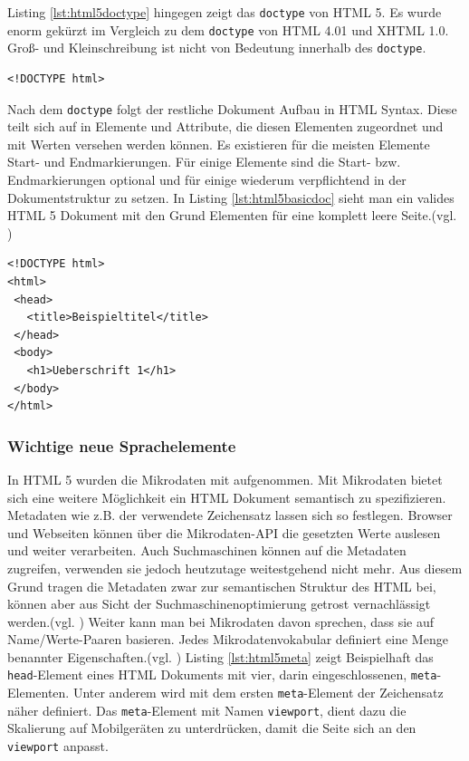 Listing \ref{lst:html5doctype}	hingegen zeigt das \texttt{doctype} von HTML 5. Es wurde enorm gekürzt im Vergleich zu dem \texttt{doctype} von HTML 4.01 und XHTML 1.0. Groß- und Kleinschreibung ist nicht von Bedeutung innerhalb des \texttt{doctype}. 

\vspace{1em}
\begin{lstlisting}[language=HTML5, caption=HTML 5 \texttt{doctype}-Element, label=lst:html5doctype]
<!DOCTYPE html>
\end{lstlisting}		
	
Nach dem \texttt{doctype} folgt der restliche Dokument Aufbau in HTML Syntax. Diese teilt sich auf in Elemente und Attribute, die diesen Elementen zugeordnet und mit Werten versehen werden können. Es existieren für die meisten Elemente Start- und Endmarkierungen. Für einige Elemente sind die Start- bzw. Endmarkierungen optional und für einige wiederum verpflichtend in der Dokumentstruktur zu setzen. In Listing \ref{lst:html5basicdoc} sieht man ein valides HTML 5 Dokument mit den Grund Elementen für eine komplett leere Seite.(vgl. \cite[S.58]{KronHTML2011})

\vspace{1em}
\begin{lstlisting}[language=HTML5, caption=HTML 5 Basis Dokument, label=lst:html5basicdoc]
<!DOCTYPE html>
<html>
 <head>
   <title>Beispieltitel</title>
 </head>
 <body>
   <h1>Ueberschrift 1</h1>
 </body>
</html>
\end{lstlisting}
	
\subsubsection{Wichtige neue Sprachelemente} In HTML 5 wurden die Mikrodaten mit aufgenommen. Mit Mikrodaten bietet sich eine weitere Möglichkeit ein HTML Dokument semantisch zu spezifizieren. Metadaten wie z.B. der verwendete Zeichensatz lassen sich so festlegen. Browser und Webseiten können über die Mikrodaten-API die gesetzten Werte auslesen und weiter verarbeiten. Auch Suchmaschinen können auf die Metadaten zugreifen, verwenden sie jedoch heutzutage weitestgehend nicht mehr. Aus diesem Grund tragen die Metadaten zwar zur semantischen Struktur des HTML bei, können aber aus Sicht der Suchmaschinenoptimierung getrost vernachlässigt werden.(vgl. \cite{SelfHtml20142}) Weiter kann man bei Mikrodaten davon sprechen, \glqq [...] dass sie auf Name/Werte-Paaren basieren. Jedes Mikrodatenvokabular definiert eine Menge benannter Eigenschaften.\grqq{}(vgl. \cite[S.174]{PilgDurc2011}) Listing \ref{lst:html5meta} zeigt Beispielhaft das \texttt{head}-Element eines HTML Dokuments mit vier, darin eingeschlossenen, \texttt{meta}-Elementen. Unter anderem wird mit dem ersten \texttt{meta}-Element der Zeichensatz näher definiert. Das \texttt{meta}-Element mit Namen \texttt{viewport}, dient dazu die Skalierung auf Mobilgeräten zu unterdrücken, damit die Seite sich an den \texttt{viewport} anpasst.

